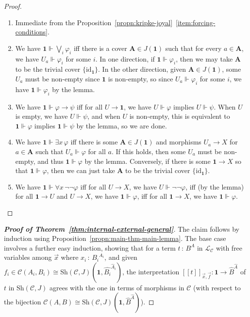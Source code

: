 \documentclass[11pt]{amsart}
\newcommand\bA{\mathbf{A}}
\newcommand\cC{\mathcal{C}}
\newcommand\cL{\mathcal{L}}
\newcommand\id{\mathrm{id}}
\renewcommand\phi{\varphi}
\newcommand\sem[1]{[\![#1]\!]}
\newcommand\set[2][]{#1\{{#2}#1\}}
\newcommand\Sh{\mathrm{Sh}}
\newcommand\tm{\mathbf{1}}
\newcommand\tolon{{\,:\,}}
\newcommand\vx{\vec{x}}
\newcommand\wh[1]{\widehat{#1}}
\theoremstyle{definition}
\theoremstyle{remark}
\theoremstyle{plain}
\begin{document}
\begin{proof}
  \leavevmode
  \begin{enumerate}
    \item[(1)-(3)]
      Immediate from the Proposition~\ref{propn:kripke-joyal}~\ref{item:forcing-conditions}.
      \setcounter{enumi}{3}
    \item
      We have \(\tm \Vdash \bigvee_i \phi_i\)
      iff there is a cover \( \bA \in J(\tm) \)
      such that for every \( a \in \bA \),
      we have \( U_a \Vdash \phi_i \) for some \( i \).
      In one direction,
      if \(\tm \Vdash \phi_i\),
      then we may take \( \bA \) to be the trivial cover \( \set{\id_\tm} \).
      In the other direction,
      given \( \bA \in J(\tm) \), some \( U_a \) must be non-empty since \( \tm \) is non-empty,
      so since \(U_a \Vdash \phi_i\) for some \( i \),
      we have \(\tm \Vdash \phi_i\) by the lemma.
    \item
      We have \(\tm \Vdash \phi \to \psi\)
      iff for all \(U \to \tm\),
      we have \(U \Vdash \phi\) implies \(U \Vdash \psi\).
      When \(U\) is empty,
      we have \(U \Vdash \psi\),
      and when \(U\) is non-empty,
      this is equivalent to \(\tm \Vdash \phi\) implies \(\tm \Vdash \psi\) by the lemma,
      so we are done.
    \item
      We have \(\tm \Vdash \exists x \, \phi\)
      iff there is some \( \bA \in J(\tm) \) and morphisms \( U_a \to X \) for \( a \in \bA \)
      such that \( U_a \Vdash \phi \) for all \( a \).
      If this holds, then some \( U_a \) must be non-empty, and thus \(\tm \Vdash \phi\) by the lemma.
      Conversely,
      if there is some \(\tm \to X\) so that \(\tm \Vdash \phi\),
      then we can just take \( \bA \) to be the trivial cover \( \set{\id_\tm} \).
    \item
      We have \(\tm \Vdash \forall x \, \lnot \lnot \phi\)
      iff for all \(U \to X\),
      we have \(U \Vdash \lnot \lnot \phi\),
      iff (by the lemma) for all \(\tm \to U\) and \(U \to X\),
      we have \(\tm \Vdash \phi\),
      iff for all \(\tm \to X\),
      we have \(\tm \Vdash \phi\).
      \qedhere
  \end{enumerate}
\end{proof}

\begin{proof}[\textbf{\textup{Proof of Theorem~\ref{thm:internal-external-general}}}]
  The claim follows by induction using Proposition~\ref{propn:main-thm-main-lemma}.
  The base case involves a further easy induction, showing that for a term \( t \tolon B^A \) in \( \cL_{\cC} \) with free variables among \( \vx \) where \( x_i \tolon {B_i}^{A_i} \), and given \( f_i \in \cC(A_i, B_i) \cong \Sh(\cC, J)(\tm, \wh{B_i}^{\wh A_i}) \), the interpretation \( \sem{t}_{\vx,\vec{f}} \colon \tm \to \wh B^{\wh A} \) of \( t \) in \( \Sh(\cC, J) \) agrees with the one in terms of morphisms in \( \cC \) (with respect to the bijection \( \cC(A, B) \cong \Sh(\cC, J)(\tm, \wh B^{\wh A}) \)).
\end{proof}
\end{document}
